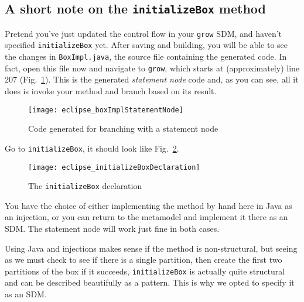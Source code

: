 \newpage
\hypertarget{initialize notes}{}
\subsection{A short note on the \texttt{initializeBox} method}
\genHeader

Pretend you've just updated the control flow in your \texttt{grow} SDM, and haven't specified \texttt{initializeBox} yet. After saving and building, you will be
able to see the changes in \texttt{BoxImpl.java}, the source file containing the generated code. In fact, open this file now and navigate to \texttt{grow},
which starts at (approximately) line 207 (Fig.~\ref{eclipse:initBoxImpl}). This is the generated \emph{statement node} code and, as you can see, all it does is
invoke your method and branch based on its result. 

\begin{figure}[htp]
\begin{center}
  \texttt{[image: eclipse\_boxImplStatementNode]}
  \caption{Code generated for branching with a statement node}
  \label{eclipse:initBoxImpl}
\end{center}
\end{figure}

Go to \texttt{initializeBox}, it should look like Fig.~\ref{eclipse:initBoxDecl}.

\begin{figure}[htp]
\begin{center}
  \texttt{[image: eclipse\_initializeBoxDeclaration]}
  \caption{The \texttt{initializeBox} declaration}
  \label{eclipse:initBoxDecl}
\end{center}
\end{figure}

You have the choice of either implementing the method by hand here in Java as an injection, or you can return to the metamodel and implement it there as an SDM.
The statement node will work just fine in both cases.

Using Java and injections makes sense if the method is non-structural, but seeing as we must check to see if there is a single partition, then create the
first two partitions of the box if it succeeds, \texttt{initializeBox} is actually quite structural and can be described beautifully as a pattern. This is why
we opted to specify it as an SDM.

